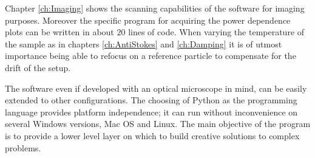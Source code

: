 Chapter \ref{ch:Imaging} shows the scanning capabilities of the software for
imaging purposes. Moreover the specific program for acquiring the power
dependence plots can be written in about $20$ lines of code. When varying the
temperature of the sample as in chapters \ref{ch:AntiStokes} and
\ref{ch:Damping} it is of utmost importance being able to refocus on a reference
particle to compensate for the drift of the setup.  

The software even if developed with an optical microscope in mind, can be easily
extended to other configurations. The choosing of Python as the programming
language provides platform independence; it can run without inconvenience on
several Windows versions, Mac OS and Linux. The main objective of the program is
to provide a lower level layer on which to build creative solutions to complex
problems.

